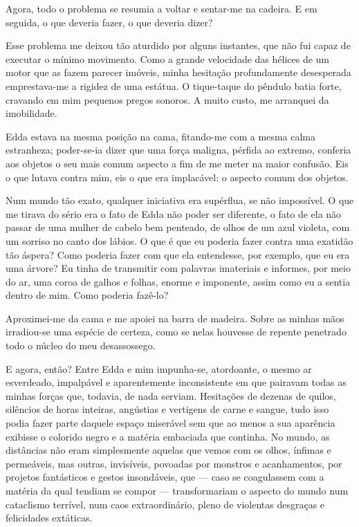 Agora, todo o problema se resumia a voltar e sentar-me na cadeira. E em seguida, o que deveria fazer, o que deveria dizer?

Esse problema me deixou tão aturdido por alguns instantes, que não fui capaz de executar o mínimo movimento. Como a grande velocidade das hélices de um motor que as fazem parecer imóveis, minha hesitação profundamente desesperada emprestava-me a rigidez de uma estátua. O tique-taque do pêndulo batia forte, cravando em mim pequenos pregos sonoros. A muito custo, me arranquei da imobilidade. 

Edda estava na mesma posição na cama, fitando-me com a mesma calma estranheza; poder-se-ia dizer que uma força maligna, pérfida ao extremo, conferia aos objetos o seu mais comum aspecto a fim de me meter na maior confusão. Eis o que lutava contra mim, eis o que era implacável: o aspecto comum dos objetos.

Num mundo tão exato, qualquer iniciativa era supérflua, se não impossível. O que me tirava do sério era o fato de Edda não poder ser diferente, o fato de ela não passar de uma mulher de cabelo bem penteado, de olhos de um azul violeta, com um sorriso no canto dos lábios. O que é que eu poderia fazer contra uma exatidão tão áspera? Como poderia fazer com que ela entendesse, por exemplo, que eu era uma árvore? Eu tinha de transmitir com palavras imateriais e informes, por meio do ar, uma coroa de galhos e folhas, enorme e imponente, assim como eu a sentia dentro de mim. Como poderia fazê-lo?

Aproximei-me da cama e me apoiei na barra de madeira. Sobre as minhas mãos irradiou-se uma espécie de certeza, como se nelas houvesse de repente penetrado todo o núcleo do meu desassossego.

E agora, então? Entre Edda e mim impunha-se, atordoante, o mesmo ar esverdeado, impalpável e aparentemente inconsistente em que pairavam todas as minhas forças que, todavia, de nada serviam. Hesitações de dezenas de quilos, silêncios de horas inteiras, angústias e vertigens de carne e sangue, tudo isso podia fazer parte daquele espaço miserável sem que ao menos a sua aparência exibisse o colorido negro e a matéria embaciada que continha. No mundo, as distâncias não eram simplesmente aquelas que vemos com os olhos, ínfimas e permeáveis, mas outras, invisíveis, povoadas por monstros e acanhamentos, por projetos fantásticos e gestos insondáveis, que --- caso se coagulassem com a matéria da qual tendiam se compor --- transformariam o aspecto do mundo num cataclismo terrível, num caos extraordinário, pleno de violentas desgraças e felicidades extáticas.

